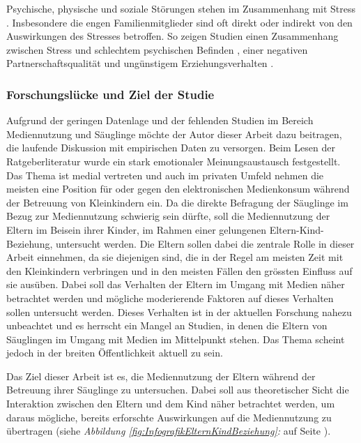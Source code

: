 Psychische, physische und soziale Störungen stehen im Zusammenhang mit Stress \cite{Elfering2002, Burisch1994}. Insbesondere die engen Familienmitglieder sind oft direkt oder indirekt von den Auswirkungen des Stresses betroffen. So zeigen Studien einen Zusammenhang zwischen Stress und schlechtem psychischen Befinden \cite{Burisch1994, Krohne1997}, einer negativen Partnerschaftsqualität  \nohyphens{\cite{Bodenmann2000, Bodenmann1999, Bodenmann2000a}} und ungünstigem Erziehungsverhalten  \nohyphens{\cite{Abidin1992, Belsky1984, WebsterStratton2000}}.

\subsubsection{Forschungslücke und Ziel der Studie}
Aufgrund der geringen Datenlage und der fehlenden Studien im Bereich Mediennutzung und Säuglinge möchte der Autor dieser Arbeit dazu beitragen, die laufende Diskussion mit empirischen Daten zu versorgen. Beim Lesen der Ratgeberliteratur wurde ein stark emotionaler Meinungsaustausch festgestellt. Das Thema ist medial vertreten und auch im privaten Umfeld nehmen die meisten eine Position für oder gegen den elektronischen Medienkonsum während der Betreuung von Kleinkindern ein. Da die direkte Befragung der Säuglinge im Bezug zur Mediennutzung schwierig sein dürfte, soll die Mediennutzung der Eltern im Beisein ihrer Kinder, im Rahmen einer gelungenen Eltern-Kind-Beziehung, untersucht werden. Die Eltern sollen dabei die zentrale Rolle in dieser Arbeit einnehmen, da sie diejenigen sind, die in der Regel am meisten Zeit mit den Kleinkindern verbringen und in den meisten Fällen den grössten Einfluss auf sie ausüben. Dabei soll das Verhalten der Eltern im Umgang mit Medien näher betrachtet werden und mögliche moderierende Faktoren auf dieses Verhalten sollen untersucht werden. Dieses Verhalten ist in der aktuellen Forschung nahezu unbeachtet und es herrscht ein Mangel an Studien, in denen die Eltern von Säuglingen im Umgang mit Medien im Mittelpunkt stehen. Das Thema scheint jedoch in der breiten Öffentlichkeit aktuell zu sein. 

Das Ziel dieser Arbeit ist es, die Mediennutzung der Eltern während der Betreuung ihrer Säuglinge zu untersuchen. Dabei soll aus theoretischer Sicht die Interaktion  zwischen den Eltern und dem Kind näher betrachtet werden, um daraus mögliche, bereits erforschte Auswirkungen auf die Mediennutzung zu übertragen (siehe \textit{Abbildung \ref{fig:InfografikElternKindBeziehung}: } auf Seite \pageref{fig:InfografikElternKindBeziehung}). 

